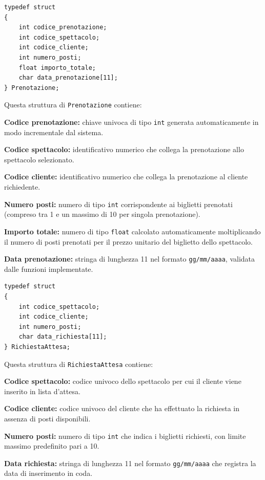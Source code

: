 \documentclass[11pt,a4paper,oneside,openany]{book}
\newenvironment{listacomp}{%
    \small
    \begin{list}{\textendash}{%
        \setlength{\topsep}{2pt}%
        \setlength{\partopsep}{0pt}%
        \setlength{\itemsep}{1pt}%
        \setlength{\parsep}{0pt}%
        \setlength{\leftmargin}{1.2em}%
    }%
}{%
    \end{list}%
}
\begin{document}
\vspace{0.2cm}
\begin{samepage}
\begin{lstlisting}[caption={Definizione della struttura Prenotazione}]
typedef struct
{
    int codice_prenotazione;
    int codice_spettacolo;
    int codice_cliente;
    int numero_posti;
    float importo_totale;
    char data_prenotazione[11];
} Prenotazione;
\end{lstlisting}
Questa struttura di \texttt{Prenotazione} contiene:
\begin{listacomp}
    \item \textbf{Codice prenotazione:} chiave univoca di tipo \texttt{int} generata automaticamente in modo incrementale dal sistema.
    \item \textbf{Codice spettacolo:} identificativo numerico che collega la prenotazione allo spettacolo selezionato.
    \item \textbf{Codice cliente:} identificativo numerico che collega la prenotazione al cliente richiedente.
    \item \textbf{Numero posti:} numero di tipo \texttt{int} corrispondente ai biglietti prenotati (compreso tra 1 e un massimo di 10 per singola prenotazione).
    \item \textbf{Importo totale:} numero di tipo \texttt{float} calcolato automaticamente moltiplicando il numero di posti prenotati per il prezzo unitario del biglietto dello spettacolo.
    \item \textbf{Data prenotazione:} stringa di lunghezza 11 nel formato \texttt{gg/mm/aaaa}, validata dalle funzioni implementate.
\end{listacomp}
\end{samepage}

\vspace{0.2cm}
\begin{samepage}
\begin{lstlisting}[caption={Definizione della struttura RichiestaAttesa}]
typedef struct
{
    int codice_spettacolo;
    int codice_cliente;
    int numero_posti;
    char data_richiesta[11];
} RichiestaAttesa;
\end{lstlisting}
Questa struttura di \texttt{RichiestaAttesa} contiene:
\begin{listacomp}
    \item \textbf{Codice spettacolo:} codice univoco dello spettacolo per cui il cliente viene inserito in lista d'attesa.
    \item \textbf{Codice cliente:} codice univoco del cliente che ha effettuato la richiesta in assenza di posti disponibili.
    \item \textbf{Numero posti:} numero di tipo \texttt{int} che indica i biglietti richiesti, con limite massimo predefinito pari a 10.
    \item \textbf{Data richiesta:} stringa di lunghezza 11 nel formato \texttt{gg/mm/aaaa} che registra la data di inserimento in coda.
\end{listacomp}
\end{samepage}
\end{document}
